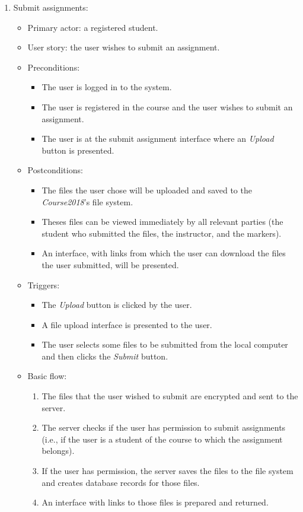 \begin{enumerate}
\item Submit assignments:
\begin{itemize}
    \item Primary actor: a registered student.
    \item User story: the user wishes to submit an assignment.
    \item Preconditions:
        \begin{itemize}
            \item The user is logged in to the system.
            \item The user is registered in the course and the user wishes to
                submit an assignment.
            \item The user is at the submit assignment interface where an
                \emph{Upload} button is presented.
        \end{itemize}
    \item Postconditions:
        \begin{itemize}
            \item The files the user chose will be uploaded and saved to the
                \emph{Course2018}'s file system.
            \item Theses files can be viewed immediately by all relevant parties
                (the student who submitted the files, the instructor,
                and the markers).
            \item An interface, with links from which the user can
                download the files the user submitted, will be presented.
        \end{itemize}
    \item Triggers:
        \begin{itemize}
            \item The \emph{Upload} button is clicked by the user.
            \item A file upload interface is presented to the user.
            \item The user selects some files to be submitted from the 
                local computer and then clicks the \emph{Submit} button.
        \end{itemize}
    \item Basic flow:
        \begin{enumerate}
            \item The files that the user wished to submit are encrypted and
                sent to the server.
            \item The server checks if the user has permission to submit
                assignments (i.e., if the user is a
                student of the course to which the assignment belongs).
            \item If the user has permission, the server saves the files to the
                file system and creates database records for those files.
            \item An interface with links to those files is prepared and
                returned.
        \end{enumerate}
\end{itemize}


\end{enumerate}
